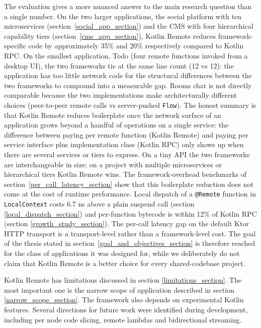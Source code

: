 \documentclass[a4paper,11pt,oneside]{article}
\newcommand{\kotlini}[1]{\texttt{#1}}
\begin{document}
The evaluation gives a more nuanced answer to the main research question than a single number.
On the two larger applications, the social platform with ten microservices
(section~\ref{social_app_section}) and the CMS with four hierarchical capability tiers
(section~\ref{cms_app_section}), Kotlin Remote reduces framework-specific code by
approximately 35\% and 20\% respectively compared to Kotlin RPC. On the smallest application,
Todo (four remote functions invoked from a desktop UI), the two frameworks tie at the same
line count (12 vs 12): the application has too little network code for the structural
differences between the two frameworks to compound into a measurable gap. Rooms chat is not
directly comparable because the two implementations make architecturally different choices
(peer-to-peer remote calls vs server-pushed \kotlini{Flow}). The honest summary is that
Kotlin Remote reduces boilerplate once the network surface of an application grows beyond
a handful of operations on a single service: the difference between paying per remote
function (Kotlin Remote) and paying per service interface plus implementation class
(Kotlin RPC) only shows up when there are several services or tiers to express. On a tiny
API the two frameworks are interchangeable in size; on a project with multiple
microservices or hierarchical tiers Kotlin Remote wins. The framework-overhead benchmarks
of section~\ref{per_call_latency_section} show that this boilerplate reduction does not
come at the cost of runtime performance. Local dispatch of a
\kotlini{@Remote} function in \kotlini{LocalContext} costs 6.7 ns above a plain suspend call
(section \ref{local_dispatch_section}) and per-function bytecode is within 12\% of Kotlin RPC
(section \ref{growth_study_section}). The per-call latency gap on the default Ktor HTTP
transport is a transport-level rather than a framework-level cost. The goal of the thesis
stated in section~\ref{goal_and_objectives_section} is therefore reached for the class of
applications it was designed for, while we deliberately do not claim that Kotlin Remote is a
better choice for every shared-codebase project.

Kotlin Remote has limitations discussed in section \ref{limitations_section}. The most important
one is the narrow scope of application described in section \ref{narrow_scope_section}. The
framework also depends on experimental Kotlin features. Several directions for future work were
identified during development, including per node code slicing, remote lambdas and bidirectional
streaming.

\newpage
%
%
\printbibliography

\clearpage
\end{document}
